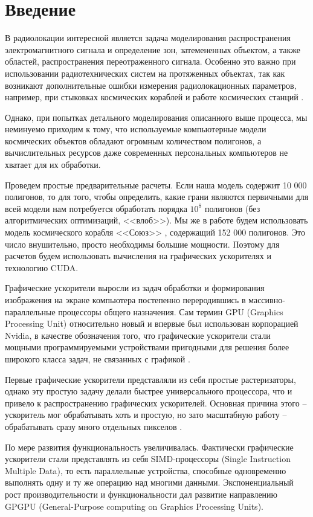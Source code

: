 \newpage
\section*{Введение}

В радиолокации интересной является задача моделирования распространения электромагнитного сигнала и определение зон, затемененных объектом, а также областей, распространения переотраженного сигнала. Особенно это важно при использовании радиотехнических систем на протяженных объектах, так как возникают дополнительные ошибки измерения радиолокационных параметров, например, при стыковках космических кораблей и работе космических станций \cite{sazonov}. 

Однако, при попытках детального моделирования описанного выше процесса, мы неминуемо приходим к тому, что используемые компьютерные модели космических объектов обладают огромным количеством полигонов, а вычислительных ресурсов даже современных персональных компьютеров не хватает для их обработки. 

Проведем простые предварительные расчеты. Если наша модель содержит 10 000 полигонов, то для того, чтобы  определить, какие грани являются первичными для всей модели нам потребуется обработать порядка $ 10^8 $ полигонов (без алгоритмических оптимизаций, <<влоб>>). Мы же в работе будем использовать модель космического корабля <<Союз>> \cite{soyz}, содержащий 152 000 полигонов. Это число внушительно, просто необходимы большие мощности. Поэтому для расчетов будем использовать вычисления на графических ускорителях и технологию CUDA. 

Графические ускорители выросли из задач обработки и формирования изображения на экране компьютера постепенно переродившись в массивно-параллельные процессоры общего назначения. Сам термин GPU (Graphics Processing Unit) относительно новый и впервые был использован корпорацией Nvidia, в качестве обозначения того, что графические ускорители стали мощными программируемыми устройствами пригодными для решения более широкого класса задач, не связанных с графикой \cite{boreskov1}.

Первые графические ускорители представляли из себя простые растеризаторы, однако эту простую задачу делали быстрее универсального процессора, что и привело к распространению графических ускорителей. Основная причина этого -- ускоритель мог обрабатывать хоть и простую, но зато масштабную работу -- обрабатывать сразу много отдельных пикселов \cite{boreskov1}.

По мере развития функциональность увеличивалась. Фактически графические ускорители стали представлять из себя SIMD-процессоры (Single Instruction Multiple Data), то есть параллельные устройства, способные одновременно выполнять одну и ту же операцию над многими данными. Экспоненциальный рост производительности и функциональности дал развитие направлению GPGPU (General-Purpose computing on Graphics Processing Units). 


